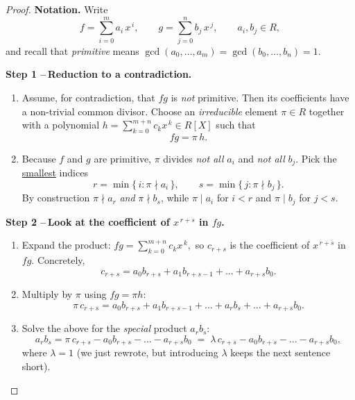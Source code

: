 \documentclass[12pt]{article}
\theoremstyle{definition} %
\theoremstyle{plain} %
\begin{document}
  \begin{proof}
  \textbf{Notation.}
  Write
  \[
    f=\sum_{i=0}^{m}a_i\,x^{\,i},\qquad
    g=\sum_{j=0}^{n}b_j\,x^{\,j},\qquad
    a_i,b_j\in R,
  \]
  and recall that \emph{primitive} means
  \(
  \gcd(a_0,\dots,a_m)=\gcd(b_0,\dots,b_n)=1.
  \)
  
  \medskip
  \noindent
  \textbf{Step 1 –\,Reduction to a contradiction.}
  
  \begin{enumerate}[label=\textbf{(\arabic*)},itemsep=6pt]
  \item
  Assume, for contradiction, that $fg$ is \emph{not} primitive.
  Then its coefficients have a non-trivial common divisor.
  Choose an \emph{irreducible} element
  \(
    \pi\in R
  \)
  together with a polynomial
  \(
    h=\sum_{k=0}^{m+n}c_k x^{\,k}\in R[X]
  \)
  such that
  \[
    fg=\pi\,h.
  \]
  
  \item
  Because $f$ and $g$ are primitive, $\pi$ divides \emph{not all} $a_i$ and
  \emph{not all} $b_j$.
  Pick the \underline{smallest} indices
  \[
    r=\min\{\,i :\pi\nmid a_i\,\},\qquad
    s=\min\{\,j :\pi\nmid b_j\,\}.
  \]
  By construction $\pi\nmid a_r$ \emph{and} $\pi\nmid b_s$, while
  $\pi\mid a_i$ for $i<r$ and $\pi\mid b_j$ for $j<s$.
  \end{enumerate}
  
  \medskip
  \noindent
  \textbf{Step 2 –\,Look at the coefficient of $x^{\,r+s}$ in $fg$.}
  
  \begin{enumerate}[label=\textbf{(\arabic*)},start=3,itemsep=6pt]
  \item
  Expand the product:
  \(
    fg=\sum_{k=0}^{m+n}c_k x^{\,k},
  \)
  so $c_{r+s}$ is the coefficient of $x^{\,r+s}$ in $fg$.
  Concretely,
  \[
    c_{r+s}=a_0b_{r+s}+a_1b_{r+s-1}+\dots+a_{r+s}b_0.
  \]
  
  \item
  Multiply by $\pi$ using $fg=\pi h$:
  \[
    \pi\,c_{r+s}
      =a_0b_{r+s}+a_1b_{r+s-1}+\dots+a_rb_s+\dots+a_{r+s}b_0.
  \]
  
  \item
  Solve the above for the \emph{special} product $a_r b_s$:
  \[
    a_r b_s
      =\pi\,c_{r+s}-a_0b_{r+s}-\dots-a_{r+s}b_0
      \;=\;\lambda\,c_{r+s}-a_0b_{r+s}-\dots-a_{r+s}b_0,
  \]
  where $\lambda=1$ (we just rewrote, but introducing $\lambda$ keeps the
  next sentence short).
  \end{enumerate}
  

\end{proof}
\end{document}
